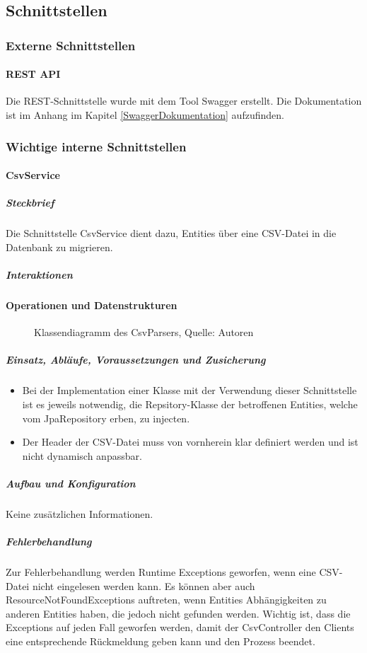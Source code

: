 \subsection{Schnittstellen}

\subsubsection{Externe Schnittstellen}
\paragraph{REST API}
Die REST-Schnittstelle wurde mit dem Tool \glqq Swagger\grqq{} erstellt.
Die Dokumentation ist im Anhang im Kapitel \ref{SwaggerDokumentation} aufzufinden.
\subsubsection{Wichtige interne Schnittstellen}


\paragraph{CsvService}
\subparagraph{Steckbrief}
Die Schnittstelle \glqq CsvService\grqq{} dient dazu, Entities über eine CSV-Datei in die Datenbank zu migrieren.
\subparagraph{Interaktionen}
\paragraph{Operationen und Datenstrukturen}
\begin{figure}[H]
    \centering
    \caption[Klassendiagramm des CsvParsers]{Klassendiagramm des CsvParsers, Quelle: Autoren}
    \label{img: csvservice}
\end{figure}

\subparagraph{Einsatz, Abläufe, Voraussetzungen und Zusicherung}
\begin{itemize}
    \item Bei der Implementation einer Klasse mit der Verwendung dieser Schnittstelle ist es jeweils notwendig, die Repsitory-Klasse der betroffenen Entities, welche vom JpaRepository erben, zu injecten.
    \item Der Header der CSV-Datei muss von vornherein klar definiert werden und ist nicht dynamisch anpassbar.
\end{itemize}

\subparagraph{Aufbau und Konfiguration}
Keine zusätzlichen Informationen.
\subparagraph{Fehlerbehandlung}
Zur Fehlerbehandlung werden Runtime Exceptions geworfen, wenn eine CSV-Datei nicht eingelesen werden kann.
Es können aber auch ResourceNotFoundExceptions auftreten, wenn Entities Abhängigkeiten zu anderen Entities haben, die jedoch nicht gefunden werden.
Wichtig ist, dass die Exceptions auf jeden Fall geworfen werden, damit der CsvController den Clients eine entsprechende Rückmeldung geben kann und den Prozess beendet.

